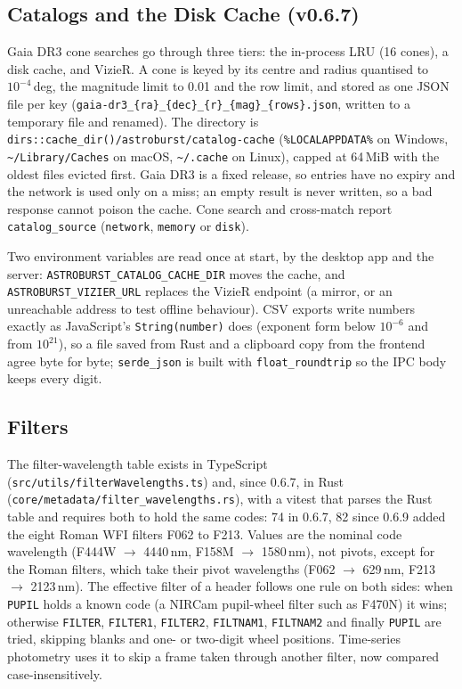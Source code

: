 \documentclass[11pt,a4paper]{article}
\newcommand{\code}[1]{\texttt{\small #1}}
\newcommand{\crate}[1]{\texttt{#1}}
\begin{document}
    \subsection{Catalogs and the Disk Cache (v0.6.7)}

    Gaia DR3 cone searches go through three tiers: the in-process LRU (16 cones), a disk cache, and VizieR. A cone is keyed by its centre and radius quantised to $10^{-4}$\,deg, the magnitude limit to 0.01 and the row limit, and stored as one JSON file per key (\code{gaia-dr3\_\{ra\}\_\{dec\}\allowbreak\_\{r\}\_\{mag\}\allowbreak\_\{rows\}.json}, written to a temporary file and renamed). The directory is \code{dirs::cache\_dir()/\allowbreak astroburst/\allowbreak catalog-cache} (\code{\%LOCALAPPDATA\%} on Windows, \code{\textasciitilde/Library/Caches} on macOS, \code{\textasciitilde/.cache} on Linux), capped at 64\,MiB with the oldest files evicted first. Gaia DR3 is a fixed release, so entries have no expiry and the network is used only on a miss; an empty result is never written, so a bad response cannot poison the cache. Cone search and cross-match report \code{catalog\_source} (\code{network}, \code{memory} or \code{disk}).

    Two environment variables are read once at start, by the desktop app and the server: \code{ASTROBURST\_CATALOG\_CACHE\_DIR} moves the cache, and \code{ASTROBURST\_VIZIER\_URL} replaces the VizieR endpoint (a mirror, or an unreachable address to test offline behaviour). CSV exports write numbers exactly as JavaScript's \code{String(number)} does (exponent form below $10^{-6}$ and from $10^{21}$), so a file saved from Rust and a clipboard copy from the frontend agree byte for byte; \crate{serde\_json} is built with \code{float\_roundtrip} so the IPC body keeps every digit.

    \subsection{Filters}

    The filter-wavelength table exists in TypeScript (\code{src/utils/filterWavelengths.ts}) and, since 0.6.7, in Rust (\code{core/metadata/filter\_wavelengths.rs}), with a vitest that parses the Rust table and requires both to hold the same codes: 74 in 0.6.7, 82 since 0.6.9 added the eight Roman WFI filters F062 to F213. Values are the nominal code wavelength (F444W $\to$ 4440\,nm, F158M $\to$ 1580\,nm), not pivots, except for the Roman filters, which take their pivot wavelengths (F062 $\to$ 629\,nm, F213 $\to$ 2123\,nm). The effective filter of a header follows one rule on both sides: when \code{PUPIL} holds a known code (a NIRCam pupil-wheel filter such as F470N) it wins; otherwise \code{FILTER}, \code{FILTER1}, \code{FILTER2}, \code{FILTNAM1}, \code{FILTNAM2} and finally \code{PUPIL} are tried, skipping blanks and one- or two-digit wheel positions. Time-series photometry uses it to skip a frame taken through another filter, now compared case-insensitively.
\end{document}
